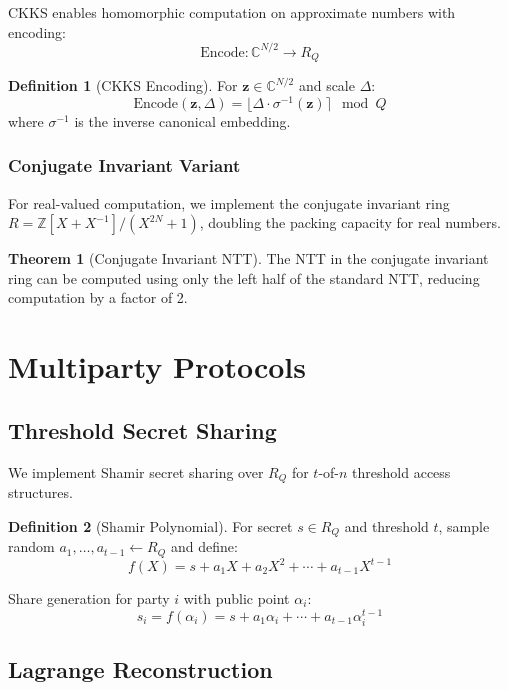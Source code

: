\documentclass[11pt,a4paper]{article}
\theoremstyle{definition}
\newtheorem{definition}{Definition}
\newtheorem{theorem}{Theorem}
\begin{document}
CKKS enables homomorphic computation on approximate numbers with encoding:
\[
\text{Encode}: \mathbb{C}^{N/2} \to R_Q
\]

\begin{definition}[CKKS Encoding]
For $\mathbf{z} \in \mathbb{C}^{N/2}$ and scale $\Delta$:
\[
\text{Encode}(\mathbf{z}, \Delta) = \lfloor \Delta \cdot \sigma^{-1}(\mathbf{z}) \rceil \mod Q
\]
where $\sigma^{-1}$ is the inverse canonical embedding.
\end{definition}

\subsubsection{Conjugate Invariant Variant}

For real-valued computation, we implement the conjugate invariant ring $R = \mathbb{Z}[X + X^{-1}]/(X^{2N} + 1)$, doubling the packing capacity for real numbers.

\begin{theorem}[Conjugate Invariant NTT]
The NTT in the conjugate invariant ring can be computed using only the left half of the standard NTT, reducing computation by a factor of 2.
\end{theorem}

\section{Multiparty Protocols}

\subsection{Threshold Secret Sharing}

We implement Shamir secret sharing over $R_Q$ for $t$-of-$n$ threshold access structures.

\begin{definition}[Shamir Polynomial]
For secret $s \in R_Q$ and threshold $t$, sample random $a_1, \ldots, a_{t-1} \leftarrow R_Q$ and define:
\[
f(X) = s + a_1 X + a_2 X^2 + \cdots + a_{t-1} X^{t-1}
\]
\end{definition}

Share generation for party $i$ with public point $\alpha_i$:
\[
s_i = f(\alpha_i) = s + a_1 \alpha_i + \cdots + a_{t-1} \alpha_i^{t-1}
\]

\subsection{Lagrange Reconstruction}
\end{document}

